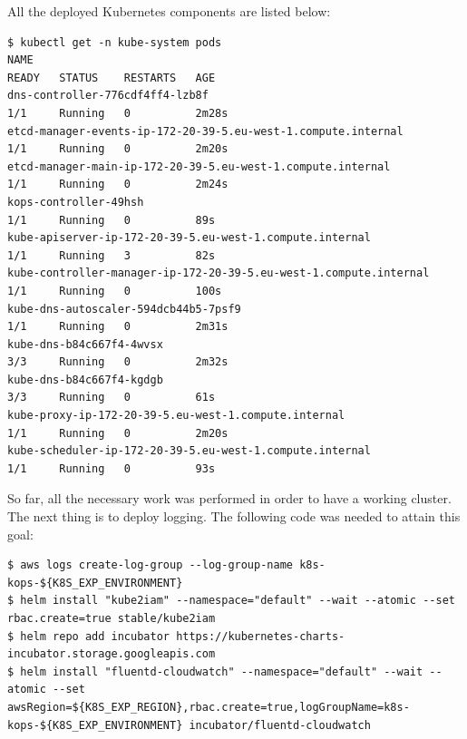 All the deployed Kubernetes components are listed below:
\begin{lstlisting}[basicstyle=\tiny,caption={Kubernetes components in a kops cluster}]
$ kubectl get -n kube-system pods
NAME                                                                READY   STATUS    RESTARTS   AGE
dns-controller-776cdf4ff4-lzb8f                                     1/1     Running   0          2m28s
etcd-manager-events-ip-172-20-39-5.eu-west-1.compute.internal       1/1     Running   0          2m20s
etcd-manager-main-ip-172-20-39-5.eu-west-1.compute.internal         1/1     Running   0          2m24s
kops-controller-49hsh                                               1/1     Running   0          89s
kube-apiserver-ip-172-20-39-5.eu-west-1.compute.internal            1/1     Running   3          82s
kube-controller-manager-ip-172-20-39-5.eu-west-1.compute.internal   1/1     Running   0          100s
kube-dns-autoscaler-594dcb44b5-7psf9                                1/1     Running   0          2m31s
kube-dns-b84c667f4-4wvsx                                            3/3     Running   0          2m32s
kube-dns-b84c667f4-kgdgb                                            3/3     Running   0          61s
kube-proxy-ip-172-20-39-5.eu-west-1.compute.internal                1/1     Running   0          2m20s
kube-scheduler-ip-172-20-39-5.eu-west-1.compute.internal            1/1     Running   0          93s
\end{lstlisting}

So far, all the necessary work was performed in order to have a working cluster. The next thing is to deploy logging. The following code was needed to attain this goal:
\begin{lstlisting}[basicstyle=\tiny,caption={Commands providing the logging solution}]
$ aws logs create-log-group --log-group-name k8s-kops-${K8S_EXP_ENVIRONMENT}
$ helm install "kube2iam" --namespace="default" --wait --atomic --set rbac.create=true stable/kube2iam
$ helm repo add incubator https://kubernetes-charts-incubator.storage.googleapis.com
$ helm install "fluentd-cloudwatch" --namespace="default" --wait --atomic --set awsRegion=${K8S_EXP_REGION},rbac.create=true,logGroupName=k8s-kops-${K8S_EXP_ENVIRONMENT} incubator/fluentd-cloudwatch
\end{lstlisting}

